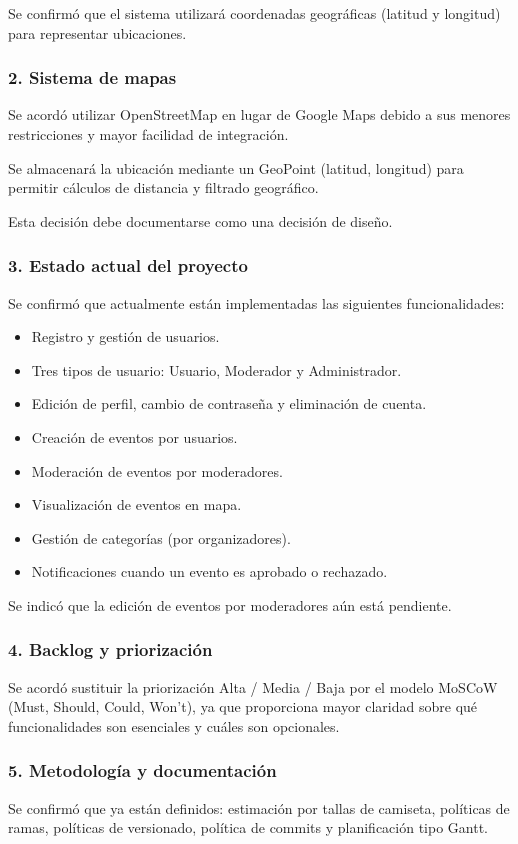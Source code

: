 Se confirmó que el sistema utilizará coordenadas geográficas (latitud y longitud) para representar ubicaciones.

\subsubsection*{2. Sistema de mapas}
Se acordó utilizar OpenStreetMap en lugar de Google Maps debido a sus menores restricciones y mayor facilidad de integración.

Se almacenará la ubicación mediante un GeoPoint (latitud, longitud) para permitir cálculos de distancia y filtrado geográfico.

Esta decisión debe documentarse como una decisión de diseño.

\subsubsection*{3. Estado actual del proyecto}
Se confirmó que actualmente están implementadas las siguientes funcionalidades:

\begin{itemize}
    \item Registro y gestión de usuarios.
    \item Tres tipos de usuario: Usuario, Moderador y Administrador.
    \item Edición de perfil, cambio de contraseña y eliminación de cuenta.
    \item Creación de eventos por usuarios.
    \item Moderación de eventos por moderadores.
    \item Visualización de eventos en mapa.
    \item Gestión de categorías (por organizadores).
    \item Notificaciones cuando un evento es aprobado o rechazado.
\end{itemize}

Se indicó que la edición de eventos por moderadores aún está pendiente.

\subsubsection*{4. Backlog y priorización}
Se acordó sustituir la priorización Alta / Media / Baja por el modelo MoSCoW (Must, Should, Could, Won't), ya que proporciona mayor claridad sobre qué funcionalidades son esenciales y cuáles son opcionales.

\subsubsection*{5. Metodología y documentación}
Se confirmó que ya están definidos: estimación por tallas de camiseta, políticas de ramas, políticas de versionado, política de commits y planificación tipo Gantt.

